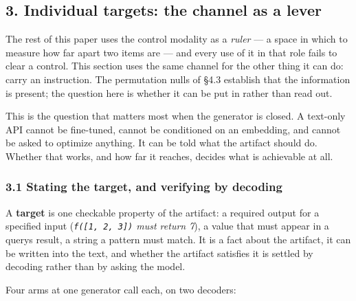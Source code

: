 \documentclass[
  10pt,
]{article}
\theoremstyle{plain}
\theoremstyle{definition}
\begin{document}
\subsection{3. Individual targets: the channel as a
lever}\label{3-individual-targets-the-channel-as-a-lever}

The rest of this paper uses the control modality as a \emph{ruler} --- a
space in which to measure how far apart two items are --- and every use
of it in that role fails to clear a control. This section uses the same
channel for the other thing it can do: carry an instruction. The
permutation nulls of §4.3 establish that the information is present; the
question here is whether it can be put in rather than read out.

This is the question that matters most when the generator is closed. A
text-only API cannot be fine-tuned, cannot be conditioned on an
embedding, and cannot be asked to optimize anything. It can be told what
the artifact should do. Whether that works, and how far it reaches,
decides what is achievable at all.

\subsubsection{3.1 Stating the target, and verifying by
decoding}\label{31-stating-the-target-and-verifying-by-decoding}

A \textbf{target} is one checkable property of the artifact: a required
output for a specified input (\emph{\texttt{f({[}1,\ 2,\ 3{]})} must
return 7}), a value that must appear in a query\textquotesingle s
result, a string a pattern must match. It is a fact about the artifact,
it can be written into the text, and whether the artifact satisfies it
is settled by decoding rather than by asking the model.

Four arms at one generator call each, on two decoders:
\end{document}
